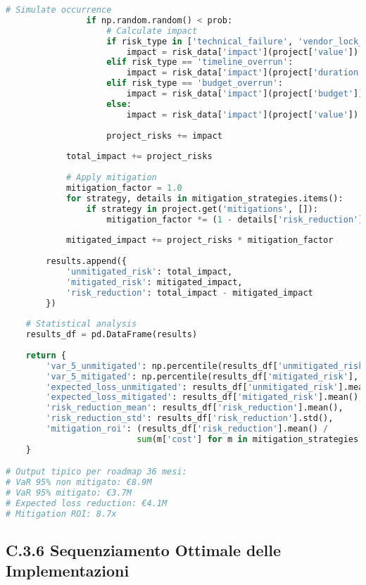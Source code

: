 \begin{lstlisting}[language=Python, caption=Analisi Monte Carlo del Rischio di Trasformazione]
                # Simulate occurrence
                if np.random.random() < prob:
                    # Calculate impact
                    if risk_type in ['technical_failure', 'vendor_lock_in', 'security_breach']:
                        impact = risk_data['impact'](project['value'])
                    elif risk_type == 'timeline_overrun':
                        impact = risk_data['impact'](project['duration'])
                    elif risk_type == 'budget_overrun':
                        impact = risk_data['impact'](project['budget'])
                    else:
                        impact = risk_data['impact'](project['value'])
                    
                    project_risks += impact
            
            total_impact += project_risks
            
            # Apply mitigation
            mitigation_factor = 1.0
            for strategy, details in mitigation_strategies.items():
                if strategy in project.get('mitigations', []):
                    mitigation_factor *= (1 - details['risk_reduction'])
            
            mitigated_impact += project_risks * mitigation_factor
        
        results.append({
            'unmitigated_risk': total_impact,
            'mitigated_risk': mitigated_impact,
            'risk_reduction': total_impact - mitigated_impact
        })
    
    # Statistical analysis
    results_df = pd.DataFrame(results)
    
    return {
        'var_5_unmitigated': np.percentile(results_df['unmitigated_risk'], 95),
        'var_5_mitigated': np.percentile(results_df['mitigated_risk'], 95),
        'expected_loss_unmitigated': results_df['unmitigated_risk'].mean(),
        'expected_loss_mitigated': results_df['mitigated_risk'].mean(),
        'risk_reduction_mean': results_df['risk_reduction'].mean(),
        'risk_reduction_std': results_df['risk_reduction'].std(),
        'mitigation_roi': (results_df['risk_reduction'].mean() / 
                          sum(m['cost'] for m in mitigation_strategies.values()))
    }

# Output tipico per roadmap 36 mesi:
# VaR 95% non mitigato: €8.9M
# VaR 95% mitigato: €3.7M
# Expected loss reduction: €4.1M
# Mitigation ROI: 8.7x
\end{lstlisting}

\subsection{C.3.6 Sequenziamento Ottimale delle Implementazioni}

